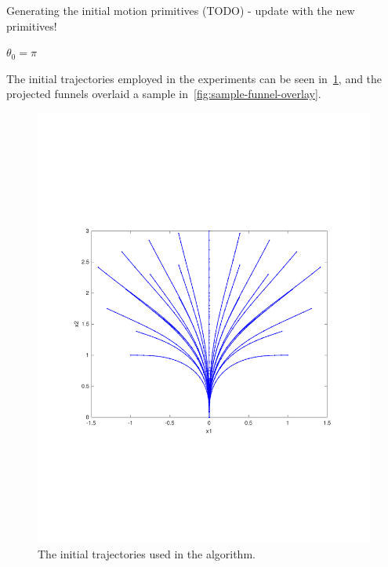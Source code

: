 \begin{algorithm}[H]
  \label{alg:initial-motion-primitives-generation}
  \caption{Generating the initial motion primitives (TODO) - update with the new
    primitives!}
  \DontPrintSemicolon \SetAlgoNoLine

   

  \(\theta_{0} = \pi\) \;

  \;
\end{algorithm}

The initial trajectories employed in the experiments can be seen
in~\cref{fig:intial-trajectories-exp}, and the projected funnels overlaid a
sample in~\cref{fig:sample-funnel-overlay}.

\begin{figure}
  \centering
  \includegraphics[scale=.5]{figures/experiments/initial-trajectories}
  \caption{The initial trajectories used in the \rrtfunnel{} algorithm.}
  \label{fig:intial-trajectories-exp}
\end{figure}

